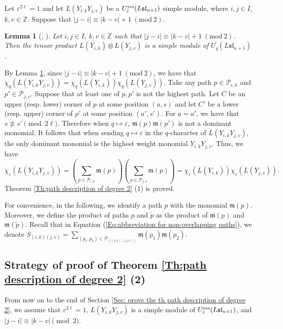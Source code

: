 \documentclass[12pt, reqno]{amsart}
\newtheorem{lemma}[theorem]{Lemma}
\numberwithin{equation}{section}
\newcommand{\ZZ}{\mathbb{Z}}
\newcommand{\res}{{\rm res}}
\begin{document}
{Let $\varepsilon^{2\ell}=1$ and let $L(Y_{i,k}Y_{j,v})$ be a $U_{\varepsilon}^{\res}({L\mathfrak{sl}_{n+1}})$ simple module, where $i, j \in I$, $k, v \in \ZZ$. Suppose that $|j-i|\equiv |k-v|+1\ (\text{mod}\ 2)$.
\begin{lemma}[{\cite[Theorem 5.8]{A07}}, {\cite[Theorem 2]{C02}}]\label{Le:tensor product q-character}
Let $i, j\in I$, $k, v\in \mathbb{Z}$ such that $|j-i|\equiv |k-v|+1\ (\text{mod}\ 2)$. Then the tensor product $L(Y_{i,k})\otimes L(Y_{j,v})$ is a simple module of $U_{q}(L\mathfrak{sl}_{n+1})$.
\end{lemma}
By Lemma \ref{Le:tensor product q-character}, since $|j-i|\equiv |k-v|+1\ (\text{mod}\ 2)$, we have that $\chi_{q}(L(Y_{i,k}Y_{j,v}))=\chi_{q}(L(Y_{i,k}))\chi_{q}(L(Y_{j,v}))$.
Take any path $p \in \mathscr{P}_{i,k}$ and $p'\in \mathscr{P}_{j,v}$. Suppose that at least one of $p, p'$ is not the highest path. Let $C$ be an upper (resp. lower) corner of $p$ at some position $(a, s)$ and let $C'$ be a lower (resp. upper) corner of $p'$ at some position $(a',s')$. For $a=a'$, we have that $s \not\equiv s' \pmod {2 \ell}$. Therefore when $q \mapsto \varepsilon$, $\mathfrak{m}(p)\mathfrak{m}(p')$ is not a dominant monomial. It follows that when sending $q \mapsto \varepsilon$ in the $q$-character of $L(Y_{i,k}Y_{j,v})$, the only dominant monomial is the highest weight monomial $Y_{i,k}Y_{j,v}$. Thus, we have
\[
\chi_{\varepsilon}(L(Y_{i,k}Y_{j,v}))=\left(\sum_{p \in \mathscr{P}_{i,k}} \mathfrak{m}(p)\right) \left(\sum_{p \in \mathscr{P}_{j,v}} \mathfrak{m}(p)\right)=\chi_{\varepsilon}(L(Y_{i,k}))\chi_{\varepsilon}(L(Y_{j,v})).
\]
Theorem \ref{Th:path description of degree 2} (1) is proved.

For convenience, in the following, we identify a path $p$ with the monomial $\mathfrak{m}(p)$. Moreover, we define the product of paths $p$ and $\widetilde{p}$ as the product of $\mathfrak{m}(p)$ and $\mathfrak{m}(\widetilde{p})$. Recall that in Equation (\ref{Eq:abbreviation for non-overlapping paths}), we denote $S_{(i,k)(j,v)} = \sum_{(p_{1},p_{2}) \in \overline{\mathscr{P}}_{((i,k),(j,v))}}\mathfrak{m}(p_1)\mathfrak{m}(p_2)$.
\subsection{Strategy of proof of Theorem \ref{Th:path description of degree 2} (2)}
From now on to the end of Section \ref{Sec: prove the th path description of degree 2}, we assume that $\varepsilon^{2 \ell}=1$, $L(Y_{i,k}Y_{j,v})$ is a simple module of $U_{\varepsilon}^{\res}({L\mathfrak{sl}_{n+1}})$, and $|j-i| \equiv |k-v| \pmod {2}$.

}
\end{document}
